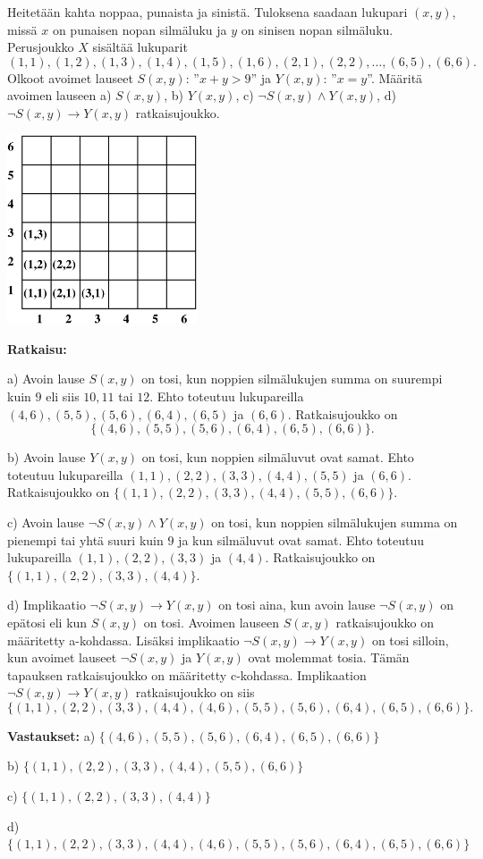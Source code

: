 \begin{esimerkki}
Heitetään kahta noppaa, punaista ja sinistä. Tuloksena saadaan lukupari $(x, y)$, missä $x$ on punaisen nopan silmäluku ja $y$ on sinisen nopan silmäluku. Perusjoukko $X$ sisältää lukuparit
\[
(1, 1), (1, 2), (1, 3), (1, 4), (1, 5), (1, 6), (2, 1), (2, 2),\ldots , (6, 5), (6, 6).
\]
Olkoot avoimet lauseet $S(x,y)$: ''$x + y > 9$'' ja $Y(x,y)$: ''$x = y$''. Määritä avoimen lauseen a) $S(x,y)$, b) $Y(x,y)$, c) $\lnot S(x,y) \land Y(x,y)$, d) $\lnot S(x,y) \to Y(x,y)$ ratkaisujoukko.

\begin{center}
\includegraphics[width=5.6cm]{pictures/6x6}
\end{center}

{\bf Ratkaisu:}

a) Avoin lause $S(x,y)$ on tosi, kun noppien silmälukujen summa on suurempi kuin $9$ eli siis $10, 11$ tai $12$. Ehto toteutuu lukupareilla $(4, 6), (5, 5), (5, 6), (6, 4), (6, 5)$ ja $(6, 6)$. Ratkaisujoukko on
\[
\{(4, 6), (5, 5), (5, 6), (6, 4), (6, 5), (6, 6)\}.
\]

b) Avoin lause $Y(x,y)$ on tosi, kun noppien silmäluvut ovat samat. Ehto toteutuu lukupareilla $(1, 1), (2, 2), (3, 3), (4, 4), (5, 5)$ ja $(6, 6)$. Ratkaisujoukko on $\{(1, 1), (2, 2), (3, 3), (4, 4), (5, 5), (6, 6)\}$.

c) Avoin lause $\lnot S(x,y) \land Y(x,y)$ on tosi, kun noppien silmälukujen summa on pienempi tai yhtä suuri kuin $9$ ja kun silmäluvut ovat samat. Ehto toteutuu lukupareilla $(1,1), (2, 2), (3, 3)$ ja $(4, 4)$. Ratkaisujoukko on $\{(1,1), (2, 2), (3, 3), (4, 4)\}$.


d) Implikaatio $\lnot S(x,y) \to Y(x,y)$ on tosi aina, kun avoin lause $\lnot S(x,y)$ on epätosi eli kun $S(x,y)$ on tosi. Avoimen lauseen $S(x,y)$ ratkaisujoukko on määritetty a-kohdassa. Lisäksi implikaatio $\lnot S(x,y) \to Y(x,y)$ on tosi silloin, kun avoimet lauseet $\lnot S(x,y)$ ja $Y(x,y)$ ovat molemmat tosia. Tämän tapauksen ratkaisujoukko on määritetty c-kohdassa. Implikaation $\lnot S(x,y) \to Y(x,y)$ ratkaisujoukko on siis
\[
\{(1,1), (2, 2), (3, 3), (4, 4), (4, 6), (5, 5), (5, 6), (6, 4), (6, 5), (6, 6)\}.
\]

{\bf Vastaukset:} a) $\{(4, 6), (5, 5), (5, 6), (6, 4), (6, 5), (6, 6)\}$

b) $\{(1, 1), (2, 2), (3, 3), (4, 4), (5, 5), (6, 6)\}$

c) $\{(1,1), (2, 2), (3, 3), (4, 4)\}$

d) $\{(1,1), (2, 2), (3, 3), (4, 4), (4, 6), (5, 5), (5, 6), (6, 4), (6, 5), (6, 6)\}$
\end{esimerkki}


